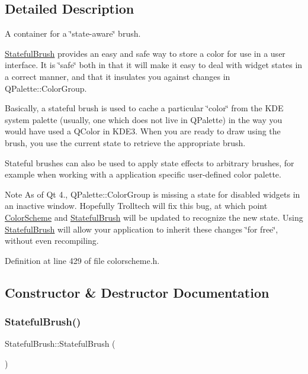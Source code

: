 \subsection{Detailed Description}
A container for a \char`\"{}state-\/aware\char`\"{} brush.

\hyperlink{class_stateful_brush}{Stateful\+Brush} provides an easy and safe way to store a color for use in a user interface. It is \char`\"{}safe\char`\"{} both in that it will make it easy to deal with widget states in a correct manner, and that it insulates you against changes in Q\+Palette\+::\+Color\+Group.

Basically, a stateful brush is used to cache a particular \char`\"{}color\char`\"{} from the K\+DE system palette (usually, one which does not live in Q\+Palette) in the way you would have used a Q\+Color in K\+D\+E3. When you are ready to draw using the brush, you use the current state to retrieve the appropriate brush.

Stateful brushes can also be used to apply state effects to arbitrary brushes, for example when working with a application specific user-\/defined color palette.

\begin{DoxyNote}{Note}
As of Qt 4., Q\+Palette\+::\+Color\+Group is missing a state for disabled widgets in an inactive window. Hopefully Trolltech will fix this bug, at which point \hyperlink{class_color_scheme}{Color\+Scheme} and \hyperlink{class_stateful_brush}{Stateful\+Brush} will be updated to recognize the new state. Using \hyperlink{class_stateful_brush}{Stateful\+Brush} will allow your application to inherit these changes \char`\"{}for free\char`\"{}, without even recompiling. 
\end{DoxyNote}


Definition at line 429 of file colorscheme.\+h.



\subsection{Constructor \& Destructor Documentation}
\mbox{\label{class_stateful_brush_a36ff921f6bd10f7bc4220d5975263bc4}} 
\subsubsection{\texorpdfstring{Stateful\+Brush()}{StatefulBrush()}\hspace{0.1cm}{\footnotesize\ttfamily [1/7]}}
{\footnotesize\ttfamily Stateful\+Brush\+::\+Stateful\+Brush (\begin{DoxyParamCaption}{ }\end{DoxyParamCaption})\hspace{0.3cm}{\ttfamily [explicit]}}

